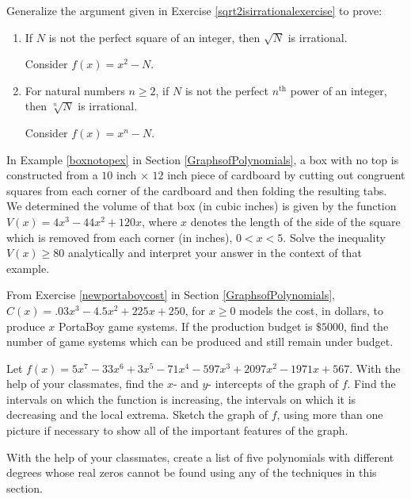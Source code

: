 \documentclass{ximera}
\begin{document}
\begin{problem}
Generalize the argument given in Exercise \ref{sqrt2isirrationalexercise} to prove:

\begin{enumerate}

\item If $N$ is not the perfect square of an integer, then $\sqrt{N}$ is irrational.
\begin{hint}
Consider $f(x) = x^2-N$.
\end{hint}

\item  For natural numbers $n \geq 2$, if $N$ is not the perfect $n^{\text{th}}$ power of an integer, then $\sqrt[n]{N}$ is irrational.
\begin{hint}
Consider $f(x) = x^n-N$.
\end{hint}

\end{enumerate}
\end{problem}

\begin{problem}
In Example \ref{boxnotopex} in Section \ref{GraphsofPolynomials}, a box with no top is constructed from a $10$ inch $\times$ $12$ inch piece of cardboard by cutting out congruent squares from each corner of the cardboard and then folding the resulting tabs.  We determined the volume of that box (in cubic inches) is given by  the function$V(x) = 4x^3-44x^2+120x$, where $x$ denotes the length of the side of the square which is removed from each corner (in inches), $0 < x < 5$.  Solve the inequality $V(x) \geq 80$ analytically and interpret your answer in the context of that example. 
\end{problem}

\begin{problem}
From Exercise \ref{newportaboycost} in Section \ref{GraphsofPolynomials}, $C(x) = .03x^{3} - 4.5x^{2} + 225x + 250$, for $x \geq 0$ models the cost, in dollars, to produce $x$ PortaBoy game systems. If the production budget is $\$5000$, find the number of game systems which can be produced and still remain under budget.
\end{problem}

\begin{problem}
Let $f(x) = 5x^{7} - 33x^{6} + 3x^{5} - 71x^{4} - 597x^{3} + 2097x^{2} - 1971x + 567$.  With the help of your classmates, find the $x$- and $y$- intercepts of the graph of $f$.  Find the intervals on which the function is increasing, the intervals on which it is decreasing and the local extrema.  Sketch the graph of $f$, using more than one picture if necessary to show all of the important features of the graph.  
\end{problem}

\begin{problem}
With the help of your classmates, create a list of five polynomials with different degrees whose real zeros cannot be found using any of the techniques in this section.
\end{problem}
\end{document}

